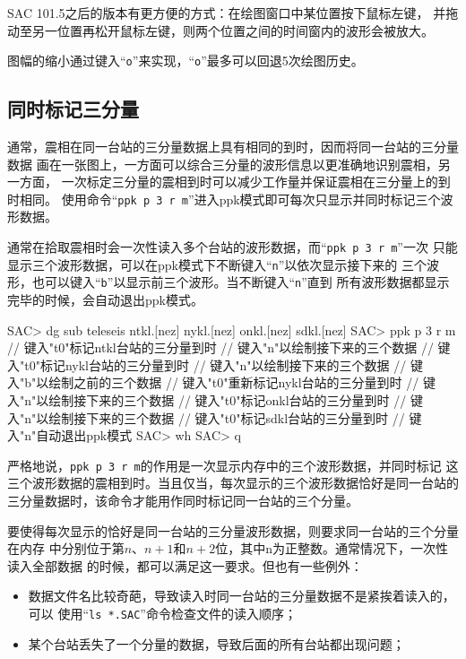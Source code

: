 SAC 101.5之后的版本有更方便的方式：在绘图窗口中某位置按下鼠标左键，
并拖动至另一位置再松开鼠标左键，则两个位置之间的时间窗内的波形会被放大。

图幅的缩小通过键入``\verb+o+''来实现，``\verb+o+''最多可以回退5次绘图历史。

\subsection{同时标记三分量}
通常，震相在同一台站的三分量数据上具有相同的到时，因而将同一台站的三分量数据
画在一张图上，一方面可以综合三分量的波形信息以更准确地识别震相，另一方面，
一次标定三分量的震相到时可以减少工作量并保证震相在三分量上的到时相同。
使用命令``\verb+ppk p 3 r m+''进入ppk模式即可每次只显示并同时标记三个波形数据。

通常在拾取震相时会一次性读入多个台站的波形数据，而``\verb+ppk p 3 r m+''一次
只能显示三个波形数据，可以在ppk模式下不断键入``\verb+n+''以依次显示接下来的
三个波形，也可以键入``\verb+b+''以显示前三个波形。当不断键入``\verb+n+''直到
所有波形数据都显示完毕的时候，会自动退出ppk模式。

\begin{SACCode}
SAC> dg sub teleseis ntkl.[nez] nykl.[nez] onkl.[nez] sdkl.[nez]
SAC> ppk p 3 r m
// 键入"t0"标记ntkl台站的三分量到时
// 键入"n"以绘制接下来的三个数据
// 键入"t0"标记nykl台站的三分量到时
// 键入"n"以绘制接下来的三个数据
// 键入"b"以绘制之前的三个数据
// 键入"t0"重新标记nykl台站的三分量到时
// 键入"n"以绘制接下来的三个数据
// 键入"t0"标记onkl台站的三分量到时
// 键入"n"以绘制接下来的三个数据
// 键入"t0"标记sdkl台站的三分量到时
// 键入"n"自动退出ppk模式
SAC> wh
SAC> q
\end{SACCode}

严格地说，\verb+ppk p 3 r m+的作用是一次显示内存中的三个波形数据，并同时标记
这三个波形数据的震相到时。当且仅当，每次显示的三个波形数据恰好是同一台站的
三分量数据时，该命令才能用作同时标记同一台站的三个分量。

要使得每次显示的恰好是同一台站的三分量波形数据，则要求同一台站的三个分量在内存
中分别位于第$n$、$n+1$和$n+2$位，其中n为正整数。通常情况下，一次性读入全部数据
的时候，都可以满足这一要求。但也有一些例外：
\begin{itemize}
\item 数据文件名比较奇葩，导致读入时同一台站的三分量数据不是紧挨着读入的，可以
    使用``\verb+ls *.SAC+''命令检查文件的读入顺序；
\item 某个台站丢失了一个分量的数据，导致后面的所有台站都出现问题；
\end{itemize}

